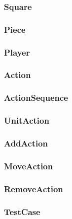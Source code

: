 \subsubsection{Square}

\subsubsection{Piece}

\subsubsection{Player}

\subsubsection{Action}

\subsubsection{ActionSequence}

\subsubsection{UnitAction}

\subsubsection{AddAction}

\subsubsection{MoveAction}

\subsubsection{RemoveAction}

\subsubsection{TestCase}
